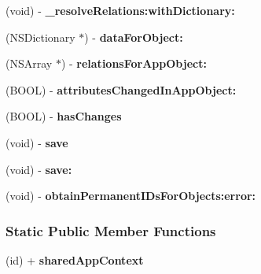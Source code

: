 \begin{DoxyCompactItemize}
\item 
\hypertarget{interface_a_t_app_context_ad590a1e779fcebf73218573783425151}{
(void) -\/ {\bfseries \_\-resolveRelations:withDictionary:}}
\label{interface_a_t_app_context_ad590a1e779fcebf73218573783425151}

\item 
\hypertarget{interface_a_t_app_context_a544871bcc8c6974f3bdf0edce58b5468}{
(NSDictionary $\ast$) -\/ {\bfseries dataForObject:}}
\label{interface_a_t_app_context_a544871bcc8c6974f3bdf0edce58b5468}

\item 
\hypertarget{interface_a_t_app_context_ab14fb60385ad32a8a2e91fa185c1f7d4}{
(NSArray $\ast$) -\/ {\bfseries relationsForAppObject:}}
\label{interface_a_t_app_context_ab14fb60385ad32a8a2e91fa185c1f7d4}

\item 
\hypertarget{interface_a_t_app_context_a344bf2060f78ed0968a5cf22c76949d2}{
(BOOL) -\/ {\bfseries attributesChangedInAppObject:}}
\label{interface_a_t_app_context_a344bf2060f78ed0968a5cf22c76949d2}

\item 
\hypertarget{interface_a_t_app_context_aa6f9c0e4fd9b9d542eda09bfcc2c2f7a}{
(BOOL) -\/ {\bfseries hasChanges}}
\label{interface_a_t_app_context_aa6f9c0e4fd9b9d542eda09bfcc2c2f7a}

\item 
\hypertarget{interface_a_t_app_context_a00ba90e776e4df7fc7d9dc3c0137138e}{
(void) -\/ {\bfseries save}}
\label{interface_a_t_app_context_a00ba90e776e4df7fc7d9dc3c0137138e}

\item 
\hypertarget{interface_a_t_app_context_a05e2eea400233f313641bd144109e1fb}{
(void) -\/ {\bfseries save:}}
\label{interface_a_t_app_context_a05e2eea400233f313641bd144109e1fb}

\item 
\hypertarget{interface_a_t_app_context_a05643fd02b9692dfaf1ebeea5bf84a6b}{
(void) -\/ {\bfseries obtainPermanentIDsForObjects:error:}}
\label{interface_a_t_app_context_a05643fd02b9692dfaf1ebeea5bf84a6b}

\end{DoxyCompactItemize}
\subsubsection*{Static Public Member Functions}
\begin{DoxyCompactItemize}
\item 
\hypertarget{interface_a_t_app_context_a00756fedbbc0ce79dd55c20862d47913}{
(id) + {\bfseries sharedAppContext}}
\label{interface_a_t_app_context_a00756fedbbc0ce79dd55c20862d47913}

\end{DoxyCompactItemize}
